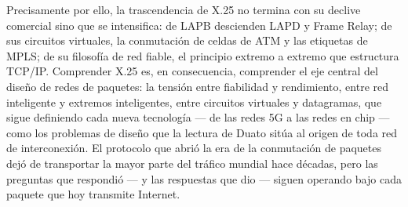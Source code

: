 \documentclass[12pt,a4paper]{article}
\begin{document}
Precisamente por ello, la trascendencia de X.25 no termina con su declive comercial sino que se intensifica: de LAPB descienden LAPD y Frame Relay; de sus circuitos virtuales, la conmutación de celdas de ATM y las etiquetas de MPLS; de su filosofía de red fiable, el principio extremo a extremo que estructura TCP/IP. Comprender X.25 es, en consecuencia, comprender el eje central del diseño de redes de paquetes: la tensión entre fiabilidad y rendimiento, entre red inteligente y extremos inteligentes, entre circuitos virtuales y datagramas, que sigue definiendo cada nueva tecnología --- de las redes 5G a las redes en chip --- como los problemas de diseño que la lectura de Duato \cite{duato2016} sitúa al origen de toda red de interconexión. El protocolo que abrió la era de la conmutación de paquetes dejó de transportar la mayor parte del tráfico mundial hace décadas, pero las preguntas que respondió --- y las respuestas que dio --- siguen operando bajo cada paquete que hoy transmite Internet.
\end{document}
